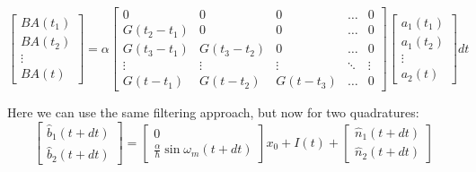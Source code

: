 \begin{equation}
 \begin{bmatrix}
  BA(t_1)\\BA(t_2)\\\vdots\\BA(t)
 \end{bmatrix}
=\alpha
\begin{bmatrix}
 0 & 0 & 0 &\hdots & 0\\
 G(t_2-t_1) &0 &0 &\hdots & 0\\
 G(t_3-t_1) &G(t_3-t_2) &0 &\hdots & 0\\
\vdots &\vdots &\vdots &\ddots & \vdots\\
G(t-t_1) &G(t-t_2) &G(t-t_3) &\hdots & 0
\end{bmatrix}
\begin{bmatrix}
 a_1(t_1)\\a_1(t_2)\\\vdots\\a_2(t)
\end{bmatrix}
dt
\end{equation}

Here we can use the same filtering approach, but now for two quadratures:
\begin{equation}
 \begin{bmatrix}
  \hat{b}_1(t+dt)\\ \hat{b}_2(t+dt)
 \end{bmatrix}
=
\begin{bmatrix}
 0 \\ \frac{\alpha}{\hbar} \sin \omega_m(t+dt)
\end{bmatrix}
x_0 + I(t)+
\begin{bmatrix}
 \hat{n}_1(t+dt) \\ \hat{n}_2(t+dt)
\end{bmatrix}
\end{equation}

